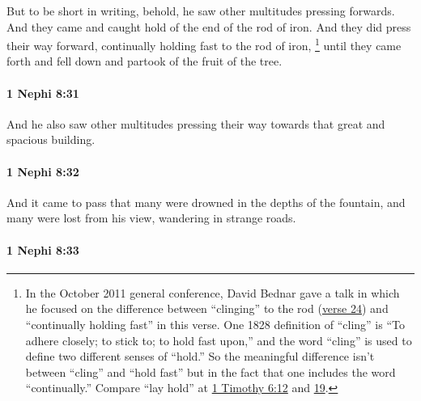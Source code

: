 			But to be short in writing, behold, he saw other multitudes pressing forwards.
			And they came and caught hold of the end of the rod of iron.
			And they did press their way forward,
			continually holding fast to the rod of iron,%
				\footnote{%
					\label{1NEPHI-8-30-NOTE-hold-fast}%
					In the October 2011 general conference, David Bednar gave a talk in which he focused on the difference between ``clinging'' to the rod (\hyperref[1NEPHI-8-24]{verse 24}) and ``continually holding fast'' in this verse. One 1828 definition of ``cling'' is ``To adhere closely; to stick to; to hold fast upon,'' and the word ``cling'' is used to define two different senses of ``hold.'' So the meaningful difference isn't between ``cling'' and ``hold fast'' but in the fact that one includes the word ``continually.'' Compare ``lay hold'' at \hyperref[1TIMOTHY-6-12]{1 Timothy 6:12} and \hyperref[1TIMOTHY-6-19]{19}.
					}
			until they came forth and fell down and partook of the fruit of the tree.

		\paragraph{1 Nephi 8:31} %
			\label{1NEPHI-8-31}

			And he also saw other multitudes pressing their way
			towards that great and spacious building.

		\paragraph{1 Nephi 8:32} %
			\label{1NEPHI-8-32}

			And it came to pass that many were drowned in the depths of the fountain,
			and many were lost from his view, wandering in strange roads.

		\paragraph{1 Nephi 8:33} %
			\label{1NEPHI-8-33}

